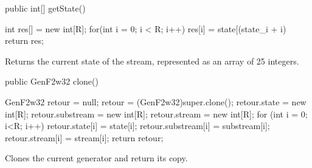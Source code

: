 \begin{htmlonly}
\end{htmlonly}
\begin{code}

   public int[] getState() \begin{hide} {
      int res[] = new int[R];
      for(int i = 0; i < R; i++)
         res[i] = state[(state_i + i) %
      return res;
   } \end{hide}
\end{code}
\begin{tabb} Returns the current state of the stream, represented as an
  array of 25 integers.
\end{tabb}
\begin{htmlonly}
\end{htmlonly}
\begin{code}

   public GenF2w32 clone() \begin{hide} {
      GenF2w32 retour = null;
      retour = (GenF2w32)super.clone();
      retour.state = new int[R];
      retour.substream = new int[R];
      retour.stream = new int[R];
      for (int i = 0; i<R; i++) {
         retour.state[i] = state[i];
         retour.substream[i] = substream[i];
         retour.stream[i] = stream[i];
      }
      return retour;
   }\end{hide}
\end{code}
 \begin{tabb} Clones the current generator and return its copy.
 \end{tabb}
 \begin{htmlonly}
\end{htmlonly}
